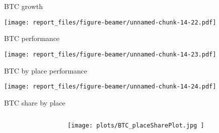 \documentclass[ignorenonframetext,]{beamer}
\begin{document}
\begin{frame}{BTC growth}
\protect\hypertarget{btc-growth}{}

\texttt{[image: report\_files/figure-beamer/unnamed-chunk-14-22.pdf]}

\end{frame}

\begin{frame}{BTC performance}
\protect\hypertarget{btc-performance}{}

\texttt{[image: report\_files/figure-beamer/unnamed-chunk-14-23.pdf]}

\end{frame}

\begin{frame}{BTC by place performance}
\protect\hypertarget{btc-by-place-performance}{}

\texttt{[image: report\_files/figure-beamer/unnamed-chunk-14-24.pdf]}

\end{frame}

\begin{frame}{BTC share by place}
\protect\hypertarget{btc-share-by-place}{}

\begin{columns}\begin{column}{0.6\textwidth}\begin{table}[ht]
\centering
{}
\end{table}
\end{column}\begin{column}{0.4\textwidth}\vspace*{-6cm}\hspace*{-0.5cm}\texttt{[image:  plots/BTC\_placeSharePlot.jpg ]}\end{column}\end{columns}

\end{frame}
\end{document}
